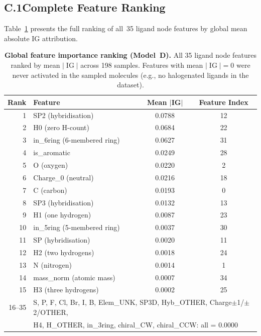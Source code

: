 \documentclass[11pt]{article}
\begin{document}
\subsection*{C.1\quad Complete Feature Ranking}

Table~\ref{tab:app_shap_ranking} presents the full ranking of all~35
ligand node features by global mean absolute IG attribution.

\begin{table}[H]
\small
\centering
\caption{\textbf{Global feature importance ranking (Model~D).}
  All 35 ligand node features ranked by mean $|\operatorname{IG}|$
  across 198 samples. Features with mean $|\operatorname{IG}| = 0$
  were never activated in the sampled molecules
  (e.g., no halogenated ligands in the dataset).}
\label{tab:app_shap_ranking}
\begin{tabular}{rlcc}
\toprule
\textbf{Rank} & \textbf{Feature} & \textbf{Mean $|$IG$|$}
  & \textbf{Feature Index} \\
\midrule
 1 & SP2 (hybridisation)       & 0.0788 & 12 \\
 2 & H0 (zero H-count)         & 0.0684 & 22 \\
 3 & in\_6ring (6-membered ring)& 0.0627 & 31 \\
 4 & is\_aromatic               & 0.0249 & 28 \\
 5 & O (oxygen)                & 0.0220 &  2 \\
 6 & Charge\_0 (neutral)        & 0.0216 & 18 \\
 7 & C (carbon)                & 0.0193 &  0 \\
 8 & SP3 (hybridisation)       & 0.0132 & 13 \\
 9 & H1 (one hydrogen)         & 0.0087 & 23 \\
10 & in\_5ring (5-membered ring)& 0.0037 & 30 \\
11 & SP (hybridisation)        & 0.0020 & 11 \\
12 & H2 (two hydrogens)        & 0.0018 & 24 \\
13 & N (nitrogen)              & 0.0014 &  1 \\
14 & mass\_norm (atomic mass)   & 0.0007 & 34 \\
15 & H3 (three hydrogens)      & 0.0002 & 25 \\
\midrule
16--35 & \multicolumn{3}{l}{S, P, F, Cl, Br, I, B, Elem\_UNK,
  SP3D, Hyb\_OTHER, Charge$\pm$1/$\pm$2/OTHER,} \\
 & \multicolumn{3}{l}{H4, H\_OTHER, in\_3ring,
  chiral\_CW, chiral\_CCW: \quad all = 0.0000} \\
\bottomrule
\end{tabular}
\end{table}
\end{document}
